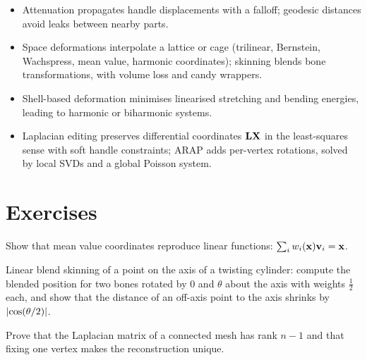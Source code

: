 \begin{keypoints}
\begin{itemize}[leftmargin=*]
  \item Attenuation propagates handle displacements with a falloff; geodesic distances avoid leaks
  between nearby parts.
  \item Space deformations interpolate a lattice or cage (trilinear, Bernstein, Wachspress, mean
  value, harmonic coordinates); skinning blends bone transformations, with volume loss and candy
  wrappers.
  \item Shell-based deformation minimises linearised stretching and bending energies, leading to
  harmonic or biharmonic systems.
  \item Laplacian editing preserves differential coordinates $\mathbf{L}\mathbf{X}$ in the least-squares sense with
  soft handle constraints; ARAP adds per-vertex rotations, solved by local SVDs and a global Poisson
  system.
\end{itemize}
\end{keypoints}

\section*{Exercises}
\begin{exercise}
Show that mean value coordinates reproduce linear functions:
$\sum_iw_i(\mathbf{x})\mathbf{v}_i=\mathbf{x}$.
\end{exercise}
\begin{exercise}
Linear blend skinning of a point on the axis of a twisting cylinder: compute the blended position
for two bones rotated by $0$ and $\theta$ about the axis with weights $\tfrac12$ each, and show that the
distance of an off-axis point to the axis shrinks by $\left\lvert \cos(\theta/2)\right\rvert$.
\end{exercise}
\begin{exercise}
Prove that the Laplacian matrix of a connected mesh has rank $n-1$ and that fixing one vertex makes
the reconstruction unique.
\end{exercise}
